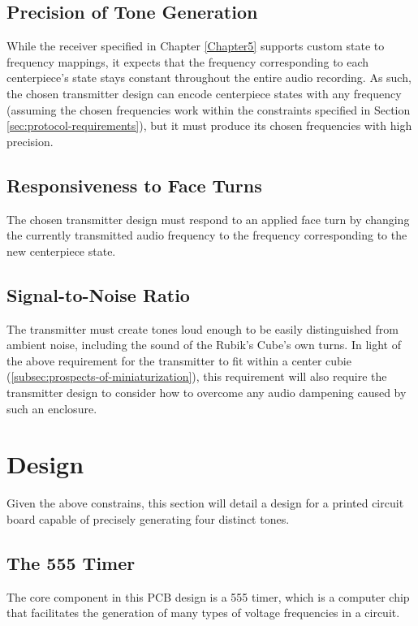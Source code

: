 \subsection{Precision of Tone Generation}
\label{subsec:precision-of-tone-generation}
While the receiver specified in Chapter \ref{Chapter5} supports custom state to frequency mappings, it expects that the frequency corresponding to each centerpiece's state stays constant throughout the entire audio recording.
As such, the chosen transmitter design can encode centerpiece states with any frequency (assuming the chosen frequencies work within the constraints specified in Section \ref{sec:protocol-requirements}), but it must produce its chosen frequencies with high precision.

\subsection{Responsiveness to Face Turns}
\label{subsec:responsiveness-to-face-turns}
The chosen transmitter design must respond to an applied face turn by changing the currently transmitted audio frequency to the frequency corresponding to the new centerpiece state.

\subsection{Signal-to-Noise Ratio}
\label{subsec:transmitter-signal-to-noise-ratio}
The transmitter must create tones loud enough to be easily distinguished from ambient noise, including the sound of the Rubik's Cube's own turns.
In light of the above requirement for the transmitter to fit within a center cubie (\ref{subsec:prospects-of-miniaturization}), this requirement will also require the transmitter design to consider how to overcome any audio dampening caused by such an enclosure.


\section{Design}
\label{sec:transmitter-design}
Given the above constrains, this section will detail a design for a printed circuit board capable of precisely generating four distinct tones.

\subsection{The 555 Timer}
\label{sec:the-555-timer}
The core component in this PCB design is a 555 timer, which is a computer chip that facilitates the generation of many types of voltage frequencies in a circuit.


